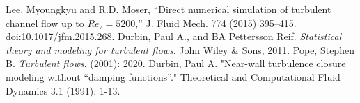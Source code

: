 \documentclass[a4paper,11pt]{article}
\begin{document}
\clearpage
\begin{thebibliography}{3}
Lee, Myoungkyu and R.D. Moser, ``Direct numerical simulation of turbulent channel flow up to $Re_{\tau}=5200$,'' J. Fluid Mech. 774 (2015) 395–415. doi:10.1017/jfm.2015.268.
    Durbin, Paul A., and BA Pettersson Reif. \textit{Statistical theory and
modeling for turbulent flows}. John Wiley \& Sons, 2011.
        Pope, Stephen B. \textit{Turbulent flows}. (2001): 2020.
        Durbin, Paul A. "Near-wall turbulence closure modeling without “damping
functions”." Theoretical and Computational Fluid Dynamics 3.1 (1991): 1-13.
 
\newpage



\end{thebibliography}
\end{document}
